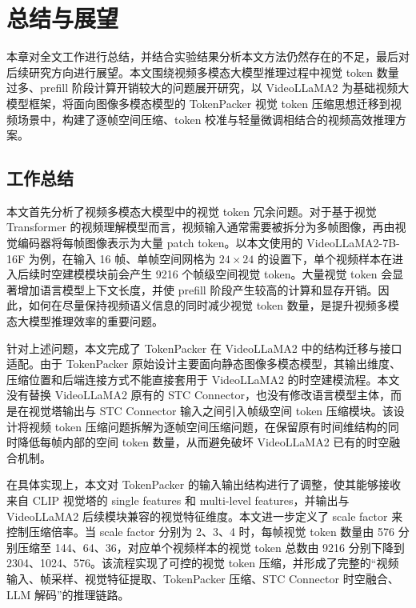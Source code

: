 \cleardoublepage

\section{总结与展望}

本章对全文工作进行总结，并结合实验结果分析本文方法仍然存在的不足，最后对后续研究方向进行展望。本文围绕视频多模态大模型推理过程中视觉 token 数量过多、prefill 阶段计算开销较大的问题展开研究，以 VideoLLaMA2 为基础视频大模型框架，将面向图像多模态模型的 TokenPacker 视觉 token 压缩思想迁移到视频场景中，构建了逐帧空间压缩、token 校准与轻量微调相结合的视频高效推理方案\cite{videollama22024,tokenpacker2024}。

\subsection{工作总结}

本文首先分析了视频多模态大模型中的视觉 token 冗余问题。对于基于视觉 Transformer 的视频理解模型而言，视频输入通常需要被拆分为多帧图像，再由视觉编码器将每帧图像表示为大量 patch token。以本文使用的 VideoLLaMA2-7B-16F 为例，在输入 16 帧、单帧空间网格为 $24\times24$ 的设置下，单个视频样本在进入后续时空建模模块前会产生 9216 个帧级空间视觉 token。大量视觉 token 会显著增加语言模型上下文长度，并使 prefill 阶段产生较高的计算和显存开销。因此，如何在尽量保持视频语义信息的同时减少视觉 token 数量，是提升视频多模态大模型推理效率的重要问题。

针对上述问题，本文完成了 TokenPacker 在 VideoLLaMA2 中的结构迁移与接口适配。由于 TokenPacker 原始设计主要面向静态图像多模态模型，其输出维度、压缩位置和后端连接方式不能直接套用于 VideoLLaMA2 的时空建模流程。本文没有替换 VideoLLaMA2 原有的 STC Connector，也没有修改语言模型主体，而是在视觉塔输出与 STC Connector 输入之间引入帧级空间 token 压缩模块。该设计将视频 token 压缩问题拆解为逐帧空间压缩问题，在保留原有时间维结构的同时降低每帧内部的空间 token 数量，从而避免破坏 VideoLLaMA2 已有的时空融合机制。

在具体实现上，本文对 TokenPacker 的输入输出结构进行了调整，使其能够接收来自 CLIP 视觉塔的 single features 和 multi-level features，并输出与 VideoLLaMA2 后续模块兼容的视觉特征维度。本文进一步定义了 scale factor 来控制压缩倍率。当 scale factor 分别为 2、3、4 时，每帧视觉 token 数量由 576 分别压缩至 144、64、36，对应单个视频样本的视觉 token 总数由 9216 分别下降到 2304、1024、576。该流程实现了可控的视觉 token 压缩，并形成了完整的“视频输入、帧采样、视觉特征提取、TokenPacker 压缩、STC Connector 时空融合、LLM 解码”的推理链路。

